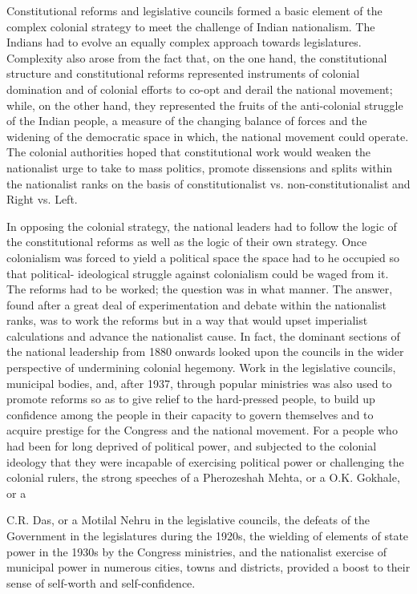 Constitutional reforms and legislative councils formed a basic element of the complex colonial strategy to meet the challenge of Indian nationalism. The Indians had to evolve an equally complex approach towards legislatures. Complexity also arose from the fact that, on the one hand, the constitutional structure and constitutional reforms represented instruments of colonial domination and of colonial efforts to co-opt and derail the national movement; while, on the other hand, they represented the fruits of the anti-colonial struggle of the Indian people, a measure of the changing balance of forces and the widening of the democratic space in which, the national movement could operate. The colonial authorities hoped that constitutional work would weaken the nationalist urge to take to mass politics, promote dissensions and splits within the nationalist ranks on the basis of constitutionalist vs. non-constitutionalist and Right vs. Left. 

In opposing the colonial strategy, the national leaders had to follow the logic of the constitutional reforms as well as the logic of their own strategy. Once colonialism was forced to yield a political space the space had to he occupied so that political- ideological struggle against colonialism could be waged from it. The reforms had to be worked; the question was in what manner. The answer, found after a great deal of experimentation and debate within the nationalist ranks, was to work the reforms but in a way that would upset imperialist calculations and advance the nationalist cause. In fact, the dominant sections of the national leadership from 1880 onwards looked upon the councils in the wider perspective of undermining colonial hegemony. Work in the legislative councils, municipal bodies, and, after 1937, through popular ministries was also used to promote reforms so as to give relief to the hard-pressed people, to build up confidence among the people in their capacity to govern themselves and to acquire prestige for the Congress and the national movement. For a people who had been for long deprived of political power, and subjected to the colonial ideology that they were incapable of exercising political power or challenging the colonial rulers, the strong speeches of a Pherozeshah Mehta, or a O.K. Gokhale, or a 

C.R. Das, or a Motilal Nehru in the legislative councils, the defeats of the Government in the legislatures during the 1920s, the wielding of elements of state power in the 1930s by the Congress ministries, and the nationalist exercise of municipal power in numerous cities, towns and districts, provided a boost to their sense of self-worth and self-confidence. 

